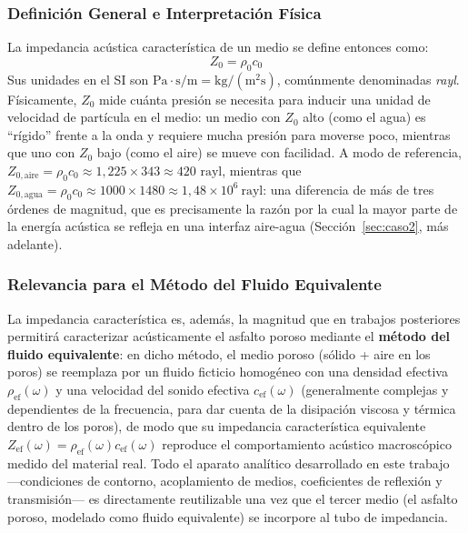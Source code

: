 \documentclass[11pt,letterpaper]{article}
\begin{document}
\subsubsection{Definición General e Interpretación Física}
La impedancia acústica característica de un medio se define entonces como:
\begin{equation}
    Z_0 = \rho_0 c_0
\end{equation}
Sus unidades en el SI son $\text{Pa}\cdot\text{s}/\text{m} = \text{kg}/(\text{m}^2\text{s})$, comúnmente denominadas \textit{rayl}. Físicamente, $Z_0$ mide cuánta presión se necesita para inducir una unidad de velocidad de partícula en el medio: un medio con $Z_0$ alto (como el agua) es ``rígido'' frente a la onda y requiere mucha presión para moverse poco, mientras que uno con $Z_0$ bajo (como el aire) se mueve con facilidad. A modo de referencia, $Z_{0,\text{aire}} = \rho_0c_0 \approx 1{,}225 \times 343 \approx \text{420 rayl}$, mientras que $Z_{0,\text{agua}} = \rho_0c_0 \approx 1000 \times 1480 \approx 1{,}48\times10^6\ \text{rayl}$: una diferencia de más de tres órdenes de magnitud, que es precisamente la razón por la cual la mayor parte de la energía acústica se refleja en una interfaz aire-agua (Sección~\ref{sec:caso2}, más adelante).

\subsubsection{Relevancia para el Método del Fluido Equivalente}
La impedancia característica es, además, la magnitud que en trabajos posteriores permitirá caracterizar acústicamente el asfalto poroso mediante el \textbf{método del fluido equivalente}: en dicho método, el medio poroso (sólido + aire en los poros) se reemplaza por un fluido ficticio homogéneo con una densidad efectiva $\rho_{\text{ef}}(\omega)$ y una velocidad del sonido efectiva $c_{\text{ef}}(\omega)$ (generalmente complejas y dependientes de la frecuencia, para dar cuenta de la disipación viscosa y térmica dentro de los poros), de modo que su impedancia característica equivalente $Z_{\text{ef}}(\omega)=\rho_{\text{ef}}(\omega)c_{\text{ef}}(\omega)$ reproduce el comportamiento acústico macroscópico medido del material real. Todo el aparato analítico desarrollado en este trabajo —condiciones de contorno, acoplamiento de medios, coeficientes de reflexión y transmisión— es directamente reutilizable una vez que el tercer medio (el asfalto poroso, modelado como fluido equivalente) se incorpore al tubo de impedancia.
\end{document}

